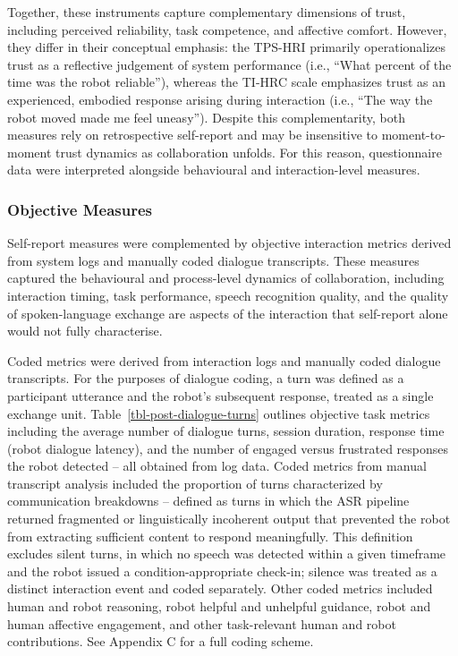 \documentclass[
  authoryear,
  doubleblind,
  3p]{elsarticle}
\begin{document}
Together, these instruments capture complementary dimensions of trust,
including perceived reliability, task competence, and affective comfort.
However, they differ in their conceptual emphasis: the TPS-HRI primarily
operationalizes trust as a reflective judgement of system performance
(i.e., ``What percent of the time was the robot reliable''), whereas the
TI-HRC scale emphasizes trust as an experienced, embodied response
arising during interaction (i.e., ``The way the robot moved made me feel
uneasy''). Despite this complementarity, both measures rely on
retrospective self-report and may be insensitive to moment-to-moment
trust dynamics as collaboration unfolds. For this reason, questionnaire
data were interpreted alongside behavioural and interaction-level
measures.

\subsubsection{Objective Measures}\label{objective-measures}

Self-report measures were complemented by objective interaction metrics
derived from system logs and manually coded dialogue transcripts. These
measures captured the behavioural and process-level dynamics of
collaboration, including interaction timing, task performance, speech
recognition quality, and the quality of spoken-language exchange are
aspects of the interaction that self-report alone would not fully
characterise.

Coded metrics were derived from interaction logs and manually coded
dialogue transcripts. For the purposes of dialogue coding, a turn was
defined as a participant utterance and the robot's subsequent response,
treated as a single exchange unit. Table~\ref{tbl-post-dialogue-turns}
outlines objective task metrics including the average number of dialogue
turns, session duration, response time (robot dialogue latency), and the
number of engaged versus frustrated responses the robot detected -- all
obtained from log data. Coded metrics from manual transcript analysis
included the proportion of turns characterized by communication
breakdowns -- defined as turns in which the ASR pipeline returned
fragmented or linguistically incoherent output that prevented the robot
from extracting sufficient content to respond meaningfully. This
definition excludes silent turns, in which no speech was detected within
a given timeframe and the robot issued a condition-appropriate check-in;
silence was treated as a distinct interaction event and coded
separately. Other coded metrics included human and robot reasoning,
robot helpful and unhelpful guidance, robot and human affective
engagement, and other task-relevant human and robot contributions. See
Appendix C for a full coding scheme.
\end{document}

